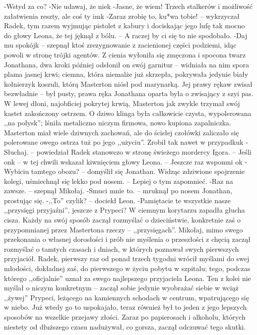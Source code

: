 \documentclass[../MAIN.tex]{subfiles}
\begin{document}
-Wstyd za co?
-Nie udawaj, że nie\3k
-Jasne, że wiem! Trzech stalkerów i możliwość załatwienia reszty, ale coś ty im\3k
-Zaraz zrobię to, ku*wa tobie! -- wykrzyczał Radek, tym razem wyjmując pistolet z kabury i dociskając jego lufę tak mocno do głowy Leona, że tej jęknął z bólu. -- A raczej by ci się to nie spodobało.
-Daj mu spokój\3k -- szepnął ktoś zrezygnowanie z zacienionej części podziemi, idąc powoli w stronę trójki agentów.
Z cienia wyłoniła się zmęczona i spocona twarz Jonathana, dwa kroki później odsłonił on swój garnitur -- widniała na nim spora plama jasnej krwi; ciemna, która niemalże już skrzepła, pokrywała jedynie biały kołnierzyk koszuli, którą Masterton niósł pod marynarką.
Jej prawy rękaw zwisał bezwładnie -- był pusty, prawa ręka Jonathana oparta była o zwisający z szyi pas. W lewej dłoni, najobficiej pokrytej krwią, Masterton jak zwykle trzymał swój kastet zakończony ostrzem. O dziwo klinga była całkowicie czysta, wypolerowana ,,na połysk''; lśniła metaliczno niczym firmowa, nowo kupiona zapalniczka.
Masterton miał wiele dziwnych zachowań, ale do ścisłej czołówki zaliczało się polerowane owego ostrza tuż po jego ,,użyciu''. Zrobił tak nawet w przypadku\3k
-Słuchaj. -- powiedział Radek stanowczo w stronę świeżego mordercy Igora. -- Jeśli on\3k -- w tej chwili wskazał kiwnięciem głowy Leona. -- Jeszcze raz wspomni o\3k
-Wybiciu tamtego obozu? -- domyślił się Jonathan. Widząc zdziwione spojrzenie kolegi, uśmiechnął się lekko pod nosem. -- Lepiej o tym zapomnieć.
-Raz na zawsze. -- szepnął Mikołaj.
-Smuci mnie to. -- mruknął po nosem Jonathan, prostując się.
-,,To'' czyli\3k? -- dociekł Leon.
-Pamiętacie te wszystkie nasze ,,przysięgi przyjaźni'', jeszcze z Prypeci?
W ciemnym korytarzu zapadła głucha cisza. Każdy na swój sposób zaczął rozmyślać o dzieciństwie, konkretnie zaś o przypomnianej przez Mastertona rzeczy -- ,,przysięgach''. Mikołaj, mimo swego przekonania o własnej dorosłości i prób nie myślenia o przeszłości z chęcią zaczął rozmyślać o tamtych czasach i dniach, w których poznawał swych pierwszych przyjaciół. Radek, pierwszy raz od ponad trzech tygodni wrócił myślami do swej młodości, dokładnej zaś, do pierwszego w życiu pobytu w szpitalu; tego, podczas którego ,,oficjalnie'' uznał za swego najlepszego przyjaciela Leona. Ten z kolei nie myślał o niczym konkretnym -- zaczął sobie jedynie wyobrażać siebie w wciąż ,,żywej'' Prypeci, leżącego na kamiennych schodach w centrum, wpatrującego się w niebo. Już wtedy go to uspokajało, teraz również był to jeden z jego lepszych sposobów na wszelkie przejawy złości. Zaraz po papierosach i alkoholu, których niestety od dłuższego czasu nadużywał, co gorsza, zaczął odczuwać tego skutki.
\end{document}
